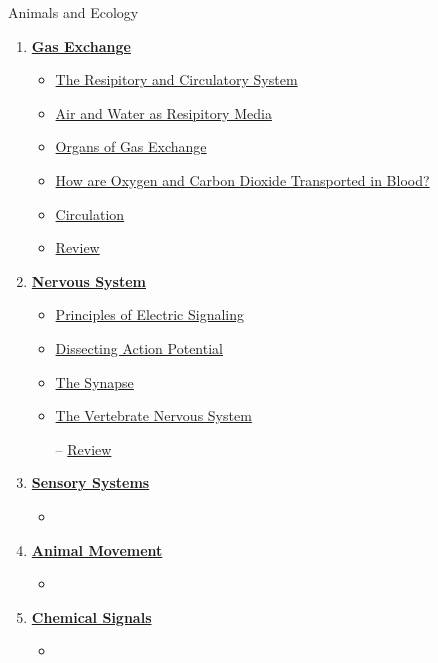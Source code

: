 \documentclass[12pt,letterpaper]{article}
\begin{document}
\begin{contbox}{Animals and Ecology}
{\begin{enumerate}[font=\bfseries, wide]
    \begin{itemize}
        \item \hyperlink{41.1}{Nutritional Requirements}
        \item \hyperlink{41.3}{How Are Nutrients Digested and Absorbed?}
        \item \hyperlink{41.4}{Nutritional Homeostasis}
        \item \hyperlink{41.r}{Review}
    \end{itemize}
\item \hyperlink{42}{\textbf{Gas Exchange}}
    \begin{itemize}
        \item \hyperlink{42.1}{The Resipitory and Circulatory System}
        \item \hyperlink{42.2}{Air and Water as Resipitory Media}
        \item \hyperlink{42.3}{Organs of Gas Exchange}
        \item \hyperlink{42.4}{How are Oxygen and Carbon Dioxide Transported in Blood?}
        \item \hyperlink{42.5}{Circulation}
        \item \hyperlink{42.r}{Review}
    \end{itemize}
\item \hyperlink{43}{\textbf{Nervous System}}
    \begin{itemize}
        \item \hyperlink{43.1}{Principles of Electric Signaling}
        \item \hyperlink{43.2}{Dissecting Action Potential}
        \item \hyperlink{43.3}{The Synapse}
        \item \hyperlink{43.4}{The Vertebrate Nervous System}
        \item [--] \hyperlink{43.r}{Review}
    \end{itemize}
\item \hyperlink{44}{\textbf{Sensory Systems}}
    \begin{itemize}
        \item 
    \end{itemize}
\item \hyperlink{45}{\textbf{Animal Movement}}
    \begin{itemize}
        \item 
    \end{itemize}
\item \hyperlink{46}{\textbf{Chemical Signals}}
    \begin{itemize}
        \item 
    \end{itemize}
\end{enumerate}
}\end{contbox}
\end{document}
